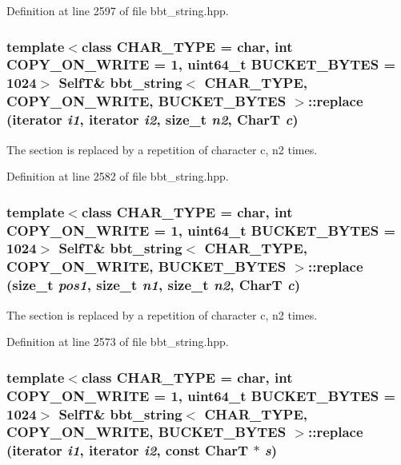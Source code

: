 Definition at line 2597 of file bbt\_\-string.hpp.\hypertarget{classbbt__string_7125b62da40b819bc3780a759664f668}{
\subsubsection[{replace}]{\setlength{\rightskip}{0pt plus 5cm}template$<$class CHAR\_\-TYPE  = char, int COPY\_\-ON\_\-WRITE = 1, uint64\_\-t BUCKET\_\-BYTES = 1024$>$ {\bf SelfT}\& {\bf bbt\_\-string}$<$ CHAR\_\-TYPE, COPY\_\-ON\_\-WRITE, BUCKET\_\-BYTES $>$::replace (iterator {\em i1}, \/  iterator {\em i2}, \/  size\_\-t {\em n2}, \/  CharT {\em c})}}
\label{classbbt__string_7125b62da40b819bc3780a759664f668}


The section is replaced by a repetition of character c, n2 times. 

Definition at line 2582 of file bbt\_\-string.hpp.\hypertarget{classbbt__string_146596df06229f2f8b4984a44b07d6dc}{
\subsubsection[{replace}]{\setlength{\rightskip}{0pt plus 5cm}template$<$class CHAR\_\-TYPE  = char, int COPY\_\-ON\_\-WRITE = 1, uint64\_\-t BUCKET\_\-BYTES = 1024$>$ {\bf SelfT}\& {\bf bbt\_\-string}$<$ CHAR\_\-TYPE, COPY\_\-ON\_\-WRITE, BUCKET\_\-BYTES $>$::replace (size\_\-t {\em pos1}, \/  size\_\-t {\em n1}, \/  size\_\-t {\em n2}, \/  CharT {\em c})}}
\label{classbbt__string_146596df06229f2f8b4984a44b07d6dc}


The section is replaced by a repetition of character c, n2 times. 

Definition at line 2573 of file bbt\_\-string.hpp.\hypertarget{classbbt__string_682dfcac635e137557d90c4c2d960c69}{
\subsubsection[{replace}]{\setlength{\rightskip}{0pt plus 5cm}template$<$class CHAR\_\-TYPE  = char, int COPY\_\-ON\_\-WRITE = 1, uint64\_\-t BUCKET\_\-BYTES = 1024$>$ {\bf SelfT}\& {\bf bbt\_\-string}$<$ CHAR\_\-TYPE, COPY\_\-ON\_\-WRITE, BUCKET\_\-BYTES $>$::replace (iterator {\em i1}, \/  iterator {\em i2}, \/  const CharT $\ast$ {\em s})}}
\label{classbbt__string_682dfcac635e137557d90c4c2d960c69}


